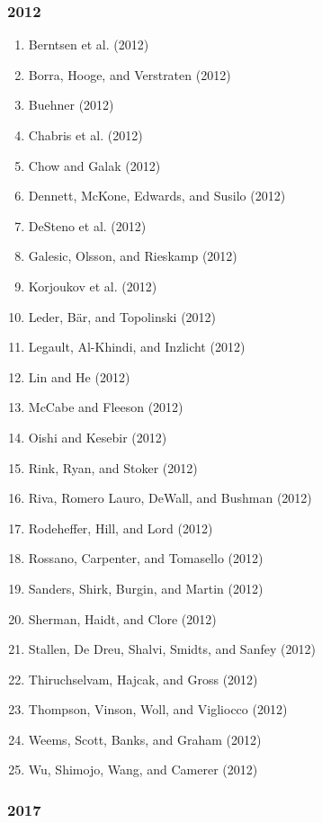 \documentclass[english,man]{apa6}
\providecommand{\tightlist}{%
  \setlength{\itemsep}{0pt}\setlength{\parskip}{0pt}}
\theoremstyle{definition}
\theoremstyle{definition}
\theoremstyle{definition}
\theoremstyle{remark}
\begin{document}
\subsubsection{2012}\label{section-42}

\begin{enumerate}
\def\labelenumi{\arabic{enumi})}
\tightlist
\item
  Berntsen et al. (2012)
\item
  Borra, Hooge, and Verstraten (2012)
\item
  Buehner (2012)
\item
  Chabris et al. (2012)
\item
  Chow and Galak (2012)
\item
  Dennett, McKone, Edwards, and Susilo (2012)
\item
  DeSteno et al. (2012)
\item
  Galesic, Olsson, and Rieskamp (2012)
\item
  Korjoukov et al. (2012)
\item
  Leder, Bär, and Topolinski (2012)
\item
  Legault, Al-Khindi, and Inzlicht (2012)
\item
  Lin and He (2012)
\item
  McCabe and Fleeson (2012)
\item
  Oishi and Kesebir (2012)
\item
  Rink, Ryan, and Stoker (2012)
\item
  Riva, Romero Lauro, DeWall, and Bushman (2012)
\item
  Rodeheffer, Hill, and Lord (2012)
\item
  Rossano, Carpenter, and Tomasello (2012)
\item
  Sanders, Shirk, Burgin, and Martin (2012)
\item
  Sherman, Haidt, and Clore (2012)
\item
  Stallen, De Dreu, Shalvi, Smidts, and Sanfey (2012)
\item
  Thiruchselvam, Hajcak, and Gross (2012)
\item
  Thompson, Vinson, Woll, and Vigliocco (2012)
\item
  Weems, Scott, Banks, and Graham (2012)
\item
  Wu, Shimojo, Wang, and Camerer (2012)
\end{enumerate}

\subsubsection{2017}\label{section-43}
\end{document}
